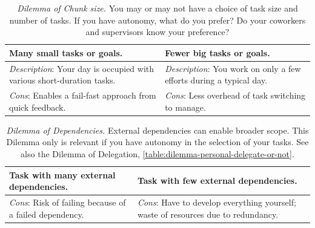 \begin{center}
\begin{table}[H] %
\begin{tabular}{ | m{\dilemmatablewidth}| m{\dilemmatablewidth} | } 
  \hline
  \textbf{Many small tasks or goals.} & 
  \textbf{Fewer big tasks or goals.} \\ 
  \hline
  \textit{Description}: Your day is occupied with various short-duration tasks. & 
  \textit{Description}: You work on only a few efforts during a typical day. \\  
    \hline
  \textit{Cons}: Enables a fail-fast approach from quick feedback. & 
  \textit{Cons}: Less overhead of task switching to manage. \\
  \hline
\end{tabular}
\caption{
\textit{Dilemma of Chunk size.}
You may or may not have a choice of task size and number of tasks. If you have autonomy, what do you prefer? Do your coworkers and supervisors know your preference? 
}
\label{table:dilemma-chunk-size}
\end{table}
\end{center}



\begin{center}
\begin{table}[H] %
\begin{tabular}{ | m{\dilemmatablewidth}| m{\dilemmatablewidth} | } 
  \hline
  \textbf{Task with many external dependencies.} & 
  \textbf{Task with few external dependencies.} \\ 
  \hline
  \textit{Cons}: Risk of failing because of a failed dependency. & 
  \textit{Cons}: Have to develop everything yourself; waste of resources due to redundancy. \\  
  \hline
\end{tabular}
\caption{
\textit{Dilemma of Dependencies.}
External dependencies can enable broader scope. This Dilemma only is relevant if you have autonomy in the selection of your tasks. See also the Dilemma of Delegation, \ref{table:dilemma-personal-delegate-or-not}.
}
\label{table:dilemma-personal-number-of-external-dependencies}
\end{table}
\end{center}

